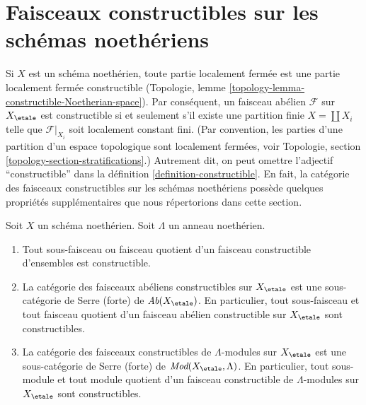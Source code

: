 \section{Faisceaux constructibles sur les schémas noethériens}
\label{section-noetherian-constructible}

\noindent
Si $X$ est un schéma noethérien, toute partie localement fermée est une
partie localement fermée constructible
(Topologie, lemme \ref{topology-lemma-constructible-Noetherian-space}).
Par conséquent, un faisceau abélien $\mathcal{F}$ sur $X_\etale$ est constructible
si et seulement s'il existe une partition finie $X = \coprod X_i$
telle que $\mathcal{F}|_{X_i}$ soit localement constant fini.
(Par convention, les parties d'une partition d'un espace topologique sont
localement fermées, voir Topologie, section \ref{topology-section-stratifications}.)
Autrement dit, on peut omettre l'adjectif ``constructible'' dans la
définition \ref{definition-constructible}. En fait, la catégorie
des faisceaux constructibles sur les
schémas noethériens possède quelques propriétés supplémentaires que nous
répertorions dans cette section.

\begin{proposition}
\label{proposition-constructible-over-noetherian}
Soit $X$ un schéma noethérien. Soit $\Lambda$ un anneau noethérien.
\begin{enumerate}
\item Tout sous-faisceau ou faisceau quotient d'un faisceau constructible
d'ensembles est constructible.
\item La catégorie des faisceaux abéliens constructibles sur $X_\etale$ est une
sous-catégorie de Serre (forte) de $\textit{Ab}(X_\etale)$. En particulier,
tout sous-faisceau et tout faisceau quotient d'un faisceau abélien constructible
sur $X_\etale$ sont constructibles.
\item La catégorie des faisceaux constructibles de $\Lambda$-modules
sur $X_\etale$ est une sous-catégorie de Serre (forte) de
$\textit{Mod}(X_\etale, \Lambda)$. En particulier, tout sous-module
et tout module quotient d'un faisceau constructible de $\Lambda$-modules
sur $X_\etale$ sont constructibles.
\end{enumerate}
\end{proposition}

